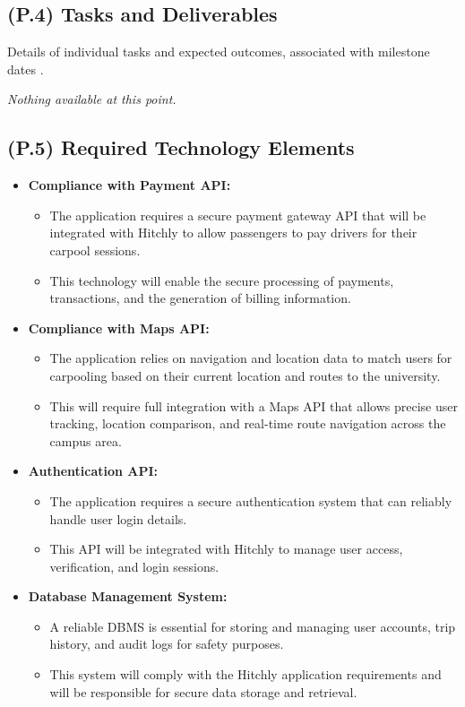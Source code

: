 \documentclass[12pt,letterpaper]{article}
\begin{document}
\subsection{(P.4) Tasks and Deliverables}
Details of individual tasks and expected outcomes, associated with milestone dates \cite{meyer2022}.

\textit{Nothing available at this point.}

\subsection{(P.5) Required Technology Elements}
\begin{itemize}
  \item \textbf{Compliance with Payment API:}
  \begin{itemize}
      \item The application requires a secure payment gateway API that will be integrated with Hitchly to allow passengers to pay drivers for their carpool sessions. 
      \item This technology will enable the secure processing of payments, transactions, and the generation of billing information.
  \end{itemize}

  \item \textbf{Compliance with Maps API:}
  \begin{itemize}
      \item The application relies on navigation and location data to match users for carpooling based on their current location and routes to the university. 
      \item This will require full integration with a Maps API that allows precise user tracking, location comparison, and real-time route navigation across the campus area.
  \end{itemize}

  \item \textbf{Authentication API:}
  \begin{itemize}
      \item The application requires a secure authentication system that can reliably handle user login details. 
      \item This API will be integrated with Hitchly to manage user access, verification, and login sessions.
  \end{itemize}

  \item \textbf{Database Management System:}
  \begin{itemize}
      \item A reliable DBMS is essential for storing and managing user accounts, trip history, and audit logs for safety purposes. 
      \item This system will comply with the Hitchly application requirements and will be responsible for secure data storage and retrieval.
  \end{itemize}
\end{itemize}
\end{document}
